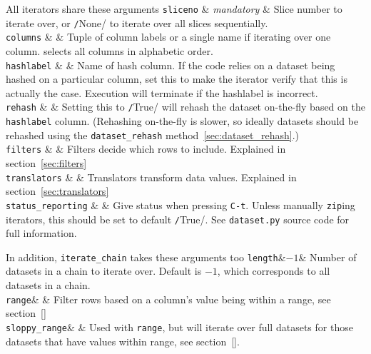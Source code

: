 All iterators share these arguments
\starttable
  \RP \texttt{sliceno} & \textsl{mandatory} & Slice number to iterate
  over, or \texttt/None/ to iterate over all slices
  sequentially. \\[1ex]

  \RP \texttt{columns} & \pyNone & Tuple of column labels or a single name if
  iterating over one column.  \pyNone selects all columns in alphabetic order.\\[1ex]

  \RP \texttt{hashlabel} & \pyNone & Name of hash column.  If the code relies
  on a dataset being hashed on a particular column, set this to make
  the iterator verify that this is actually the case.  Execution will terminate
  if the hashlabel is incorrect.\\[1ex]

  \RP \texttt{rehash} & \pyFalse & Setting this
  to \texttt/True/ will rehash the dataset on-the-fly
  based on the \texttt{hashlabel} column.  (Rehashing on-the-fly is
  slower, so ideally datasets should be rehashed using
  the \texttt{dataset\_rehash} method~\ref{sec:dataset_rehash}.)\\[1ex]
  
  \RP \texttt{filters} & \pyNone & Filters decide which rows to include.
  Explained in section~\ref{sec:filters}\\[1ex]

  \RP \texttt{translators} & \pyNone & Translators transform data values.
  Explained in section~\ref{sec:translators}\\[1ex]
  
  \RP \texttt{status\_reporting} & \pyTrue & Give status when pressing
  \texttt{C-t}.  Unless manually \texttt{zip}ing iterators, this
  should be set to default \texttt/True/.  See
  \texttt{dataset.py} source code for full information.\\
\stoptable

\noindent In addition, \texttt{iterate\_chain} takes these arguments too
\starttable
  \RP \texttt{length}&$-1$& Number of datasets in a chain to iterate over.
  Default is $-1$, which corresponds to all datasets in a chain.\\[1ex]
  
  \RP \texttt{range}& \pyNone& Filter rows based on a column's value being
  within a range, see section~\ref{}\\[1ex]

  \RP \texttt{sloppy\_range}& \pyFalse & Used with \texttt{range}, but will
  iterate over full datasets for those datasets that have values
  within range, see section~\ref{}.\\[1ex]
  
